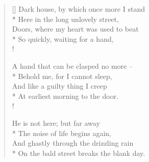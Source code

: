 \documentclass[MAIN]{subfiles}
\begin{document}
\settowidth{\versewidth}{Dark house, by which once more I stand}
\begin{verse}[\versewidth]
Dark house, by which once more I stand\\* 
\vin Here in the long unlovely street,\\
\vin Doors, where my heart was used to beat\\*
So quickly, waiting for a hand,\\!

A hand that can be clasped no more --\\*
\vin Behold me, for I cannot sleep,\\
\vin And like a guilty thing I creep\\*
At earliest morning to the door.\\!

He is not here; but far away\\*
\vin The noise of life begins again,\\
\vin And ghastly through the drizzling rain\\*
On the bald street breaks the blank day.
\end{verse}
\end{document}
